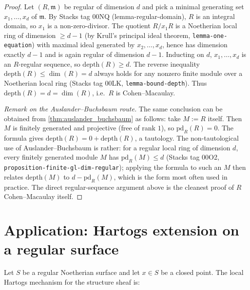 \begin{proof}





\leanok
  Let \((R, \mathfrak{m})\) be regular of dimension \(d\) and pick a minimal generating set
  \(x_1, \dots, x_d\) of \(\mathfrak{m}\). By Stacks tag 00NQ (lemma-regular-domain), \(R\) is
  an integral domain, so \(x_1\) is a non-zero-divisor. The quotient \(R/x_1 R\) is a Noetherian
  local ring of dimension \(\geq d - 1\) (by Krull's principal ideal theorem,
  \texttt{lemma-one-equation}) with maximal ideal generated by \(x_2, \dots, x_d\), hence
  has dimension exactly \(d - 1\) and is again regular of dimension \(d - 1\). Inducting on \(d\),
  \(x_1, \dots, x_d\) is an \(R\)-regular sequence, so
  \(\text{depth}(R) \geq d\). The reverse inequality \(\text{depth}(R) \leq \dim(R) = d\)
  always holds for any nonzero finite module over a Noetherian local ring
  (Stacks tag 00LK, \texttt{lemma-bound-depth}). Thus \(\text{depth}(R) = d = \dim(R)\), i.e.\
  \(R\) is Cohen--Macaulay.

  \emph{Remark on the Auslander--Buchsbaum route.} The same conclusion can be obtained from
  \cref{thm:auslander_buchsbaum} as follows: take \(M := R\) itself. Then \(M\) is
  finitely generated and projective (free of rank \(1\)), so \(\text{pd}_R(R) = 0\). The
  formula gives \(\text{depth}(R) = 0 + \text{depth}(R)\), a tautology. The non-tautological
  use of Auslander--Buchsbaum is rather: for a regular local ring of dimension \(d\), every
  finitely generated module \(M\) has \(\text{pd}_R(M) \leq d\) (Stacks tag 00O2,
  \texttt{proposition-finite-gl-dim-regular}); applying the formula to such an \(M\) then
  relates \(\text{depth}(M)\) to \(d - \text{pd}_R(M)\), which is the form most often used in
  practice. The direct regular-sequence argument above is the cleanest proof of
  \(R\) Cohen--Macaulay itself.
\end{proof}

\section{Application: Hartogs extension on a regular surface}
\label{sec:ab_application_to_a4a}

Let \(S\) be a regular Noetherian surface and let \(x \in S\) be a closed point.  The local
Hartogs mechanism for the structure sheaf is:

